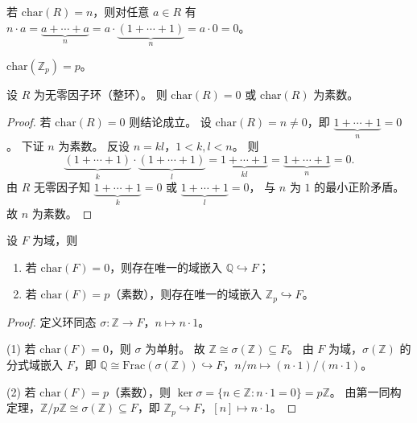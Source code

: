 \documentclass[lang=cn,a4paper,newtx]{elegantbook}
\begin{document}
\begin{remark}
  若 $\mathrm{char}(R)=n$，则对任意 $a\in R$ 有 $n\cdot a=\underbrace{a+\cdots+a}_{n}=a\cdot\underbrace{(1+\cdots+1)}_{n}=a\cdot 0=0$。
\end{remark}

\begin{example}
  $\mathrm{char}(\mathbb{Z}_p)=p$。
\end{example}

\begin{proposition}
  设 $R$ 为无零因子环（整环）。
  则 $\mathrm{char}(R)=0$ 或 $\mathrm{char}(R)$ 为素数。
\end{proposition}

\begin{proof}
  若 $\mathrm{char}(R)=0$ 则结论成立。
  设 $\mathrm{char}(R)=n\ne 0$，即 $\underbrace{1+\cdots+1}_{n}=0$。
  下证 $n$ 为素数。
  反设 $n=kl$，$1<k,l<n$。
  则
  \[
    \underbrace{(1+\cdots+1)}_{k}\cdot\underbrace{(1+\cdots+1)}_{l}=\underbrace{1+\cdots+1}_{kl}=\underbrace{1+\cdots+1}_{n}=0.
  \]
  由 $R$ 无零因子知 $\underbrace{1+\cdots+1}_{k}=0$ 或 $\underbrace{1+\cdots+1}_{l}=0$，
  与 $n$ 为 $1$ 的最小正阶矛盾。
  故 $n$ 为素数。
\end{proof}

\begin{proposition}
  设 $F$ 为域，则
  \begin{enumerate}
    \item 若 $\mathrm{char}(F)=0$，则存在唯一的域嵌入 $\mathbb{Q}\hookrightarrow F$；
    \item 若 $\mathrm{char}(F)=p$（素数），则存在唯一的域嵌入 $\mathbb{Z}_p\hookrightarrow F$。
  \end{enumerate}
\end{proposition}

\begin{proof}
  定义环同态 $\sigma\colon\mathbb{Z}\to F$，$n\mapsto n\cdot 1$。

  (1) 若 $\mathrm{char}(F)=0$，则 $\sigma$ 为单射。
  故 $\mathbb{Z}\cong\sigma(\mathbb{Z})\subseteq F$。
  由 $F$ 为域，$\sigma(\mathbb{Z})$ 的分式域嵌入 $F$，即 $\mathbb{Q}\cong\mathrm{Frac}(\sigma(\mathbb{Z}))\hookrightarrow F$，$n/m\mapsto (n\cdot 1)/(m\cdot 1)$。

  (2) 若 $\mathrm{char}(F)=p$（素数），则 $\ker\sigma=\{n\in\mathbb{Z}:n\cdot 1=0\}=p\mathbb{Z}$。
  由第一同构定理，$\mathbb{Z}/p\mathbb{Z}\cong\sigma(\mathbb{Z})\subseteq F$，即 $\mathbb{Z}_p\hookrightarrow F$，$[n]\mapsto n\cdot 1$。
\end{proof}
\end{document}
